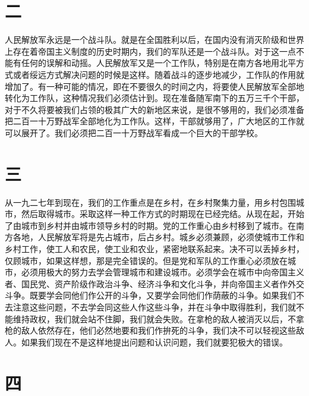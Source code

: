 \section*{二}

人民解放军永远是一个战斗队。就是在全国胜利以后，在国内没有消灭阶级和世界上存在着帝国主义制度的历史时期内，我们的军队还是一个战斗队。对于这一点不能有任何的误解和动摇。人民解放军又是一个工作队，特别是在南方各地用北平方式或者绥远方式解决问题的时候是这样。随着战斗的逐步地减少，工作队的作用就增加了。有一种可能的情况，即在不要很久的时间之内，将要使人民解放军全部地转化为工作队，这种情况我们必须估计到。现在准备随军南下的五万三千个干部，对于不久将要被我们占领的极其广大的新地区来说，是很不够用的，我们必须准备把二百一十万野战军全部地化为工作队。这样，干部就够用了，广大地区的工作就可以展开了。我们必须把二百一十万野战军看成一个巨大的干部学校。

\section*{三}

从一九二七年到现在，我们的工作重点是在乡村，在乡村聚集力量，用乡村包围城市，然后取得城市。采取这样一种工作方式的时期现在已经完结。从现在起，开始了由城市到乡村并由城市领导乡村的时期。党的工作重心由乡村移到了城市。在南方各地，人民解放军将是先占城市，后占乡村。城乡必须兼顾，必须使城市工作和乡村工作，使工人和农民，使工业和农业，紧密地联系起来。决不可以丢掉乡村，仅顾城市，如果这样想，那是完全错误的。但是党和军队的工作重心必须放在城市，必须用极大的努力去学会管理城市和建设城市。必须学会在城市中向帝国主义者、国民党、资产阶级作政治斗争、经济斗争和文化斗争，并向帝国主义者作外交斗争。既要学会同他们作公开的斗争，又要学会同他们作荫蔽的斗争。如果我们不去注意这些问题，不去学会同这些人作这些斗争，并在斗争中取得胜利，我们就不能维持政权，我们就会站不住脚，我们就会失败。在拿枪的敌人被消灭以后，不拿枪的敌人依然存在，他们必然地要和我们作拚死的斗争，我们决不可以轻视这些敌人。如果我们现在不是这样地提出问题和认识问题，我们就要犯极大的错误。

\section*{四}

